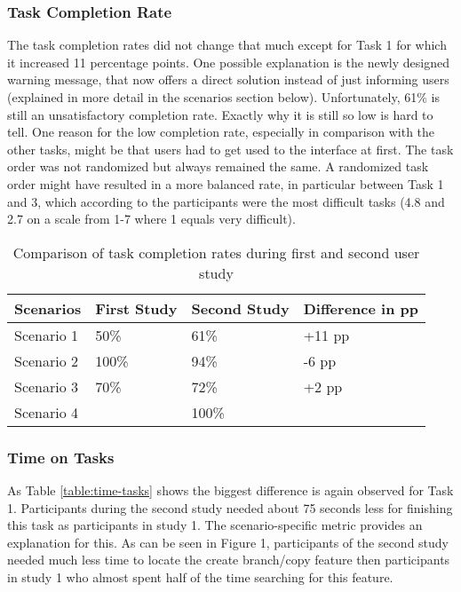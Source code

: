 \subsubsection{Task Completion Rate}
The task completion rates did not change that much except for Task 1 for which it increased 11 percentage points. One possible explanation is the newly designed warning message, that now offers a direct solution instead of just informing users (explained in more detail in the scenarios section below). Unfortunately, 61\% is still an unsatisfactory completion rate. Exactly why it is still so low is hard to tell. One reason for the low completion rate, especially in comparison with the other tasks, might be that users had to get used to the interface at first. The task order was not randomized but always remained the same. A randomized task order might have resulted in a more balanced rate, in particular between Task 1 and 3, which according to the participants were the most difficult tasks (4.8 and 2.7 on a scale from 1-7 where 1 equals very difficult).

\begin{table}[h!]
\centering
\begin{tabular}{|l|l|l|l|}
\hline
\rowcolor[HTML]{EFEFEF}
{\bf Scenarios} & {\bf First Study} & {\bf Second Study} & {\bf Difference in pp} \\ \hline
Scenario 1 & 50\% & 61\% & +11 pp \\ \hline
Scenario 2 & 100\% & 94\% & -6 pp \\ \hline
Scenario 3 & 70\% & 72\% & +2 pp \\ \hline
Scenario 4 &  & 100\% &  \\ \hline
\end{tabular}
\caption{Comparison of task completion rates during first and second user study}
\label{table:task-compl}
\end{table}

\subsubsection{Time on Tasks}
As Table \ref{table:time-tasks} shows the biggest difference is again observed for Task 1. Participants during the second study needed about 75 seconds less for finishing this task as participants in study 1. The scenario-specific metric provides an explanation for this. As can be seen in Figure 1, participants of the second study needed much less time to locate the create branch/copy feature then participants in study 1 who almost spent half of the time searching for this feature.

